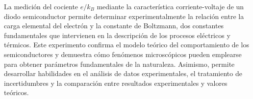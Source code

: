 La medición del cociente $e/k_B$ mediante la característica corriente-voltaje de un diodo semiconductor permite determinar experimentalmente la relación entre la carga elemental del electrón y la constante de Boltzmann, dos constantes fundamentales que intervienen en la descripción de los procesos eléctricos y térmicos. Este experimento confirma el modelo teórico del comportamiento de los semiconductores y demuestra cómo fenómenos microscópicos pueden emplearse para obtener parámetros fundamentales de la naturaleza. Asimismo, permite desarrollar habilidades en el análisis de datos experimentales, el tratamiento de incertidumbres y la comparación entre resultados experimentales y valores teóricos.